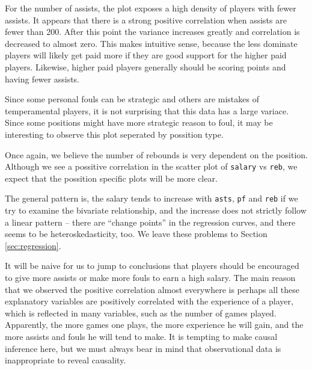 \documentclass[english]{article}
\begin{document}
For the number of assists, the plot exposes a high density of players
with fewer assists. It appears that there is a strong positive correlation
when assists are fewer than 200. After this point the variance increases
greatly and correlation is decreased to almost zero. This makes intuitive
sense, because the less dominate players will likely get paid more
if they are good support for the higher paid players. Likewise, higher
paid players generally should be scoring points and having fewer assists. 

Since some personal fouls can be strategic and others are mistakes
of temperamental players, it is not surprising that this data has
a large variace. Since some positions might have more strategic reason
to foul, it may be interesting to observe this plot seperated by possition
type. 

Once again, we believe the number of rebounds is very dependent on
the position. Although we see a possitive correlation in the scatter
plot of \texttt{salary} vs \texttt{reb}, we expect that the possition
specific plots will be more clear.

The general pattern is, the salary tends to increase with \texttt{asts},
\texttt{pf} and \texttt{reb} if we try to examine the bivariate relationship,
and the increase does not strictly follow a linear pattern -- there
are {}``change points'' in the regression curves, and there seems
to be heteroskedasticity, too. We leave these problems to Section
\ref{sec:regression}.

It will be naive for us to jump to conclusions that players should
be encouraged to give more assists or make more fouls to earn a high
salary. The main reason that we observed the positive correlation
almost everywhere is perhaps all these explanatory variables are positively
correlated with the experience of a player, which is reflected in
many variables, such as the number of games played. Apparently, the
more games one plays, the more experience he will gain, and the more
assists and fouls he will tend to make. It is tempting to make causal
inference here, but we must always bear in mind that observational
data is inappropriate to reveal causality.
\end{document}
